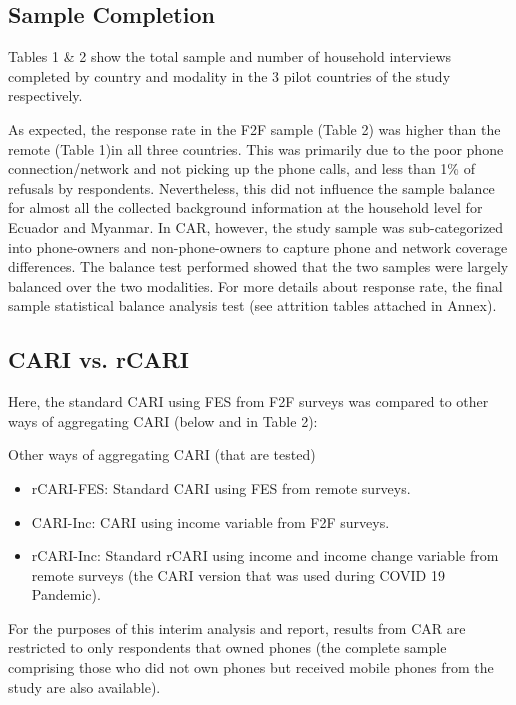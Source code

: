 \documentclass[11pt,harvard]{article}
\begin{document}
\subsection{Sample Completion}

Tables 1 \& 2 show the total sample and number of household interviews completed by country and modality in the 3 pilot countries of the study respectively.

 
\label{tab:rCARI_Overall_Completion_F2F}

 
\label{tab:rCARI_Overall_Completion_R}

As expected, the response rate in the F2F sample (Table 2) was higher than the remote (Table 1)in all three countries. This was primarily due to the poor phone connection/network and not picking up the  phone calls, and less than 1\% of refusals by respondents. Nevertheless, this did not influence the sample balance for almost all the collected background information at the household level for Ecuador and Myanmar. 
In CAR, however, the study sample was sub-categorized into phone-owners and non-phone-owners to capture phone and network coverage differences. The balance test performed showed that the two samples were largely balanced over the two modalities. For more details about response rate, the final sample statistical balance analysis test (see attrition tables attached in Annex).

	
\subsection{CARI vs. rCARI}
	
Here, the standard CARI using FES from F2F surveys was compared to other ways of aggregating CARI (below and in Table 2):
	
	Other ways of aggregating CARI (that are tested)
	\begin{itemize}[label=--, left=1.5em]
		\item rCARI-FES: Standard CARI using FES from remote surveys.
		\item CARI-Inc: CARI using income variable from F2F surveys.
		\item rCARI-Inc: Standard rCARI using income and income change variable from remote surveys (the CARI version that was used during COVID 19 Pandemic).
	\end{itemize}
	
For the purposes of this interim analysis and report, results from  CAR are restricted to only respondents that owned phones (the complete sample comprising those who did not own phones but received mobile phones from the study are  also available).
	
\end{document}
